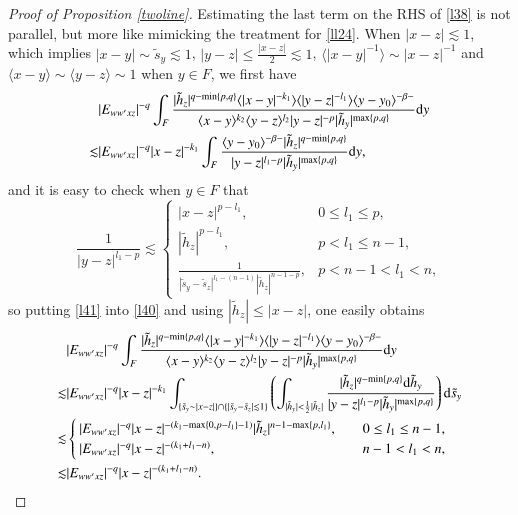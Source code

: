 \documentclass[11pt,reqno]{amsart}
\def\d{{\rm d}}
\numberwithin{equation}{section}
\theoremstyle{definition}
\begin{document}
\begin{appendix}
\begin{proof}[Proof of Proposition \ref{twoline}]
		Estimating the last term on the RHS of \eqref{l38} is not parallel, but more like mimicking the treatment for \eqref{ll24}. When $|x-z|\lesssim1$, which implies $|x-y|\sim\tilde{s}_y\lesssim1$, $|y-z|\leq\frac{|x-z|}{2}\lesssim1$, $\langle|x-y|^{-1}\rangle\sim|x-z|^{-1}$ and $\langle x-y\rangle\sim\langle y-z\rangle\sim1$ when $y\in F$, we first have
		\begin{equation}\label{l40}
			\begin{split}
				&|E_{ww'xz}|^{-q}\int_F\frac{|\tilde{h}_z|^{q-\min\{p,q\}}\langle|x-y|^{-k_1}\rangle\langle|y-z|^{-l_1}\rangle\langle y-y_0\rangle^{-\beta-}}{\langle x-y\rangle^{k_2}\langle y-z\rangle^{l_2}|y-z|^{-p}|\tilde{h}_y|^{\max\{p,q\}}}\d y\\
				\lesssim&|E_{ww'xz}|^{-q}|x-z|^{-k_1}\int_F\frac{\langle y-y_0\rangle^{-\beta-}|\tilde{h}_z|^{q-\min\{p,q\}}}{|y-z|^{l_1-p}|\tilde{h}_y|^{\max\{p,q\}}}\d y,
			\end{split}
		\end{equation}
		and it is easy to check when $y\in F$ that
		\begin{equation}\label{l41}
			\frac{1}{|y-z|^{l_1-p}}\lesssim\begin{cases}
				|x-z|^{p-l_1},\quad&0\leq l_1\leq p,\\
				|\tilde{h}_z|^{p-l_1},&p<l_1\leq n-1,\\
				\frac{1}{|\tilde{s}_y-\tilde{s}_z|^{l_1-(n-1)}|\tilde{h}_z|^{n-1-p}},&p<n-1<l_1<n,
			\end{cases}
		\end{equation}
		so putting \eqref{l41} into \eqref{l40} and using $|\tilde{h}_z|\leq|x-z|$, one easily obtains
		\begin{equation*}\label{l42}
			\begin{split}
				&|E_{ww'xz}|^{-q}\int_F\frac{|\tilde{h}_z|^{q-\min\{p,q\}}\langle|x-y|^{-k_1}\rangle\langle|y-z|^{-l_1}\rangle\langle y-y_0\rangle^{-\beta-}}{\langle x-y\rangle^{k_2}\langle y-z\rangle^{l_2}|y-z|^{-p}|\tilde{h}_y|^{\max\{p,q\}}}\d y\\
				\lesssim&|E_{ww'xz}|^{-q}|x-z|^{-k_1}\int_{\{\tilde{s}_y\sim|x-z|\}\cap\{|\tilde{s}_y-\tilde{s}_z|\lesssim1\}}\left(\int_{|\tilde{h}_y|<\frac12|\tilde{h}_z|}\frac{|\tilde{h}_z|^{q-\min\{p,q\}}\d\tilde{h}_y}{|y-z|^{l_1-p}|\tilde{h}_y|^{\max\{p,q\}}}\right)\d\tilde{s}_y\\
				\lesssim&\begin{cases}
					|E_{ww'xz}|^{-q}|x-z|^{-(k_1-\max\{0,p-l_1\}-1)}|\tilde{h}_z|^{n-1-\max\{p,l_1\}},\quad&0\leq l_1\leq n-1,\\
					|E_{ww'xz}|^{-q}|x-z|^{-(k_1+l_1-n)},&n-1<l_1<n,
				\end{cases}\\
				\lesssim&|E_{ww'xz}|^{-q}|x-z|^{-(k_1+l_1-n)}.
			\end{split}
		\end{equation*}
		

\end{proof}
\end{appendix}
\end{document}
